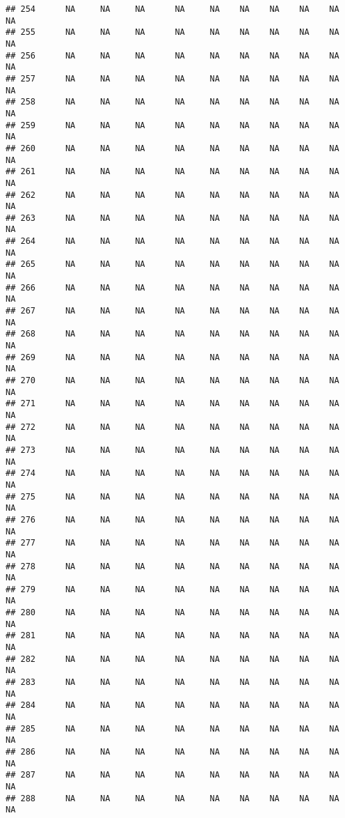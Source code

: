 \documentclass{article}\usepackage{graphicx, color}
\makeatletter
\newenvironment{kframe}{%
 \def\at@end@of@kframe{}%
 \ifinner\ifhmode%
  \def\at@end@of@kframe{\end{minipage}}%
  \begin{minipage}{\columnwidth}%
 \fi\fi%
 \def\FrameCommand##1{\hskip\@totalleftmargin \hskip-\fboxsep
 \colorbox{shadecolor}{##1}\hskip-\fboxsep
     \hskip-\linewidth \hskip-\@totalleftmargin \hskip\columnwidth}%
 \MakeFramed {\advance\hsize-\width
   \@totalleftmargin\z@ \linewidth\hsize
   \@setminipage}}%
 {\par\unskip\endMakeFramed%
 \at@end@of@kframe}
\newenvironment{knitrout}{}{} %
\makeatother
\begin{document}
\begin{knitrout}
\begin{kframe}
\begin{verbatim}
## 254      NA     NA     NA      NA     NA    NA    NA    NA    NA     NA
## 255      NA     NA     NA      NA     NA    NA    NA    NA    NA     NA
## 256      NA     NA     NA      NA     NA    NA    NA    NA    NA     NA
## 257      NA     NA     NA      NA     NA    NA    NA    NA    NA     NA
## 258      NA     NA     NA      NA     NA    NA    NA    NA    NA     NA
## 259      NA     NA     NA      NA     NA    NA    NA    NA    NA     NA
## 260      NA     NA     NA      NA     NA    NA    NA    NA    NA     NA
## 261      NA     NA     NA      NA     NA    NA    NA    NA    NA     NA
## 262      NA     NA     NA      NA     NA    NA    NA    NA    NA     NA
## 263      NA     NA     NA      NA     NA    NA    NA    NA    NA     NA
## 264      NA     NA     NA      NA     NA    NA    NA    NA    NA     NA
## 265      NA     NA     NA      NA     NA    NA    NA    NA    NA     NA
## 266      NA     NA     NA      NA     NA    NA    NA    NA    NA     NA
## 267      NA     NA     NA      NA     NA    NA    NA    NA    NA     NA
## 268      NA     NA     NA      NA     NA    NA    NA    NA    NA     NA
## 269      NA     NA     NA      NA     NA    NA    NA    NA    NA     NA
## 270      NA     NA     NA      NA     NA    NA    NA    NA    NA     NA
## 271      NA     NA     NA      NA     NA    NA    NA    NA    NA     NA
## 272      NA     NA     NA      NA     NA    NA    NA    NA    NA     NA
## 273      NA     NA     NA      NA     NA    NA    NA    NA    NA     NA
## 274      NA     NA     NA      NA     NA    NA    NA    NA    NA     NA
## 275      NA     NA     NA      NA     NA    NA    NA    NA    NA     NA
## 276      NA     NA     NA      NA     NA    NA    NA    NA    NA     NA
## 277      NA     NA     NA      NA     NA    NA    NA    NA    NA     NA
## 278      NA     NA     NA      NA     NA    NA    NA    NA    NA     NA
## 279      NA     NA     NA      NA     NA    NA    NA    NA    NA     NA
## 280      NA     NA     NA      NA     NA    NA    NA    NA    NA     NA
## 281      NA     NA     NA      NA     NA    NA    NA    NA    NA     NA
## 282      NA     NA     NA      NA     NA    NA    NA    NA    NA     NA
## 283      NA     NA     NA      NA     NA    NA    NA    NA    NA     NA
## 284      NA     NA     NA      NA     NA    NA    NA    NA    NA     NA
## 285      NA     NA     NA      NA     NA    NA    NA    NA    NA     NA
## 286      NA     NA     NA      NA     NA    NA    NA    NA    NA     NA
## 287      NA     NA     NA      NA     NA    NA    NA    NA    NA     NA
## 288      NA     NA     NA      NA     NA    NA    NA    NA    NA     NA

\end{verbatim}
\end{kframe}
\end{knitrout}
\end{document}
